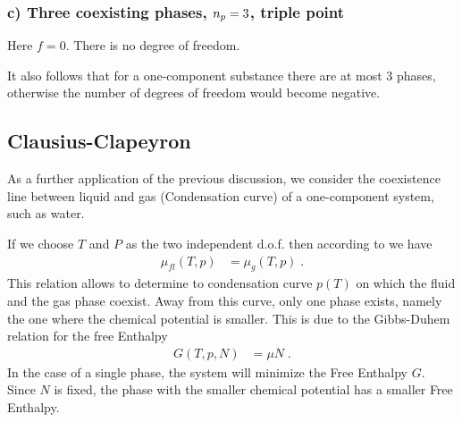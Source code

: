 \subsubsection{c) Three coexisting phases, $n_{p} =3$, triple point}

Here $f=0$. There is no degree of freedom. 

It also follows that for a one-component substance there are at most 3 phases, otherwise the
number of degrees of freedom would become negative.


\subsection{Clausius-Clapeyron}

As a further application of the previous discussion, we consider the coexistence line between
liquid and gas (Condensation curve) of a one-component system, such as water. 

If we choose $T$ and $P$ as the two independent d.o.f. then according to 
 we have
%
\begin{align}\label{eq:mu:coexist}
\mu_{fl}(T,p) &= \mu_{g}(T,p)\;.
\end{align}
%
This relation allows to determine to condensation curve $p(T)$ on which the fluid and the gas phase coexist. Away from this curve, only one phase exists, namely the one where the chemical potential is smaller. This is due to the Gibbs-Duhem relation for the free Enthalpy
%
\begin{align*}
G(T,p,N) &= \mu N\;.
\end{align*}
% 
In the case of a single phase, the system will minimize the Free Enthalpy $G$. Since $N$ is fixed,
the phase with  the smaller chemical potential has a smaller Free Enthalpy.

